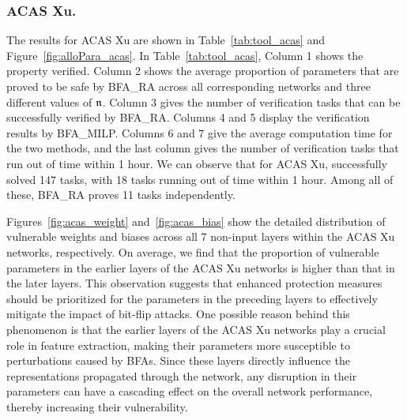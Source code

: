 \subsubsection{ACAS Xu.}\label{sec:exp_tool_small_acas} The results for ACAS Xu are shown in Table~\ref{tab:tool_acas} and Figure~\ref{fig:alloPara_acas}. In Table~\ref{tab:tool_acas}, Column 1 shows the property verified. Column 2 shows the average proportion of parameters that are proved to be safe by {\sf BFA\_RA} across all corresponding networks and three different values of $\mathfrak{n}$. Column 3 gives the number of verification tasks that can be successfully verified by {\sf BFA\_RA}. Columns 4 and 5 display the verification results by {\sf BFA\_MILP}. Columns 6 and 7 give the average computation time for the two methods, and the last column gives the number of verification tasks that run out of time within 1 hour.
% 
We can observe that for ACAS Xu, \tool successfully solved 147 tasks, with 18 tasks running out of time within 1 hour. Among all of these, {\sf BFA\_RA} proves 11 tasks independently. 


Figures~\ref{fig:acas_weight} and~\ref{fig:acas_bias} show the detailed distribution of vulnerable weights and biases across all 7 non-input layers within the ACAS Xu networks, respectively. On average, we find that the proportion of vulnerable parameters in the earlier layers of the ACAS Xu networks is higher than that in the later layers. This observation suggests that enhanced protection measures should be prioritized for the parameters in the preceding layers to effectively mitigate the impact of bit-flip attacks. One possible reason behind this phenomenon is that the earlier layers of the ACAS Xu networks play a crucial role in feature extraction, making their parameters more susceptible to perturbations caused by BFAs. Since these layers directly influence the representations propagated through the network, any disruption in their parameters can have a cascading effect on the overall network performance, thereby increasing their vulnerability.

